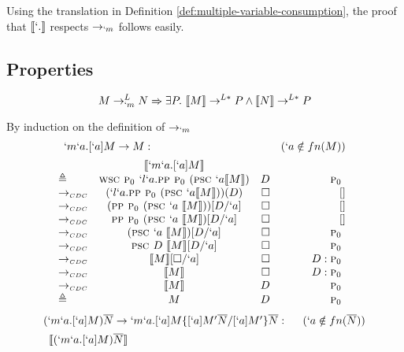 Using the translation in Definition \ref{def:multiple-variable-consumption}, the proof that $\tr{`.}$ respects $\to_{`m}$ follows easily.

\subsection{Properties}

\begin{theorem}[Soundness of $\tr{`.}$]\label{theorem:soundness}
\[ M \to_{`m}^{L} N \Rightarrow \exists P.\ \llbracket M \rrbracket \to^{L*} P \land \llbracket N \rrbracket \to^{L*} P \]
\end{theorem}

\begin{Proof}
By induction on the definition of $\rightarrow_{`m}$
\[
\begin{array}{@{}lcrr}
  \prooflabel{`m`a.[`a]M \to M} & (`a \notin fn(M)) \\
             & \tr{`m`a.[`a]M} \\
  \triangleq & \wsc \gp `l`a.\pp \gp (\psc `a \tr{M}) & D       & \gp \\
  \tocdc\    & (`l`a.\pp \gp (\psc `a \tr{M}))(D)     & \square & []     \\
  \tocdc\    & (\pp \gp (\psc `a\ \tr{M}))[D/`a]      & \square & []     \\
  \tocdc\    & \pp \gp (\psc `a\ \tr{M})[D/`a]        & \square & []     \\
  \tocdc\    & (\psc `a\ \tr{M})[D/`a]                & \square & \gp \\
  \tocdc\    & \psc D\ \tr{M}[D/`a]                   & \square & \gp \\
  \tocdc\    & \tr{M}[\square/`a]                     & \square & D:\gp \\
  \tocdc\    & \tr{M}                                 & \square & D:\gp \\
  \tocdc\    & \tr{M}                                 & D       & \gp \\
  \triangleq & M                                      & D       & \gp \\
\end{array}
\]
\[
\begin{array}{@{}lcrr}
  \prooflabel{(`m`a.[`a]M)\mult{N} \to `m`a.[`a]M\{[`a]M'\mult{N}/[`a]M'\}\mult{N}} & (`a \notin fn(\mult{N})) \\
             & \tr{(`m`a.[`a]M)\mult{N}} \\

\end{array}\]
\end{Proof}
